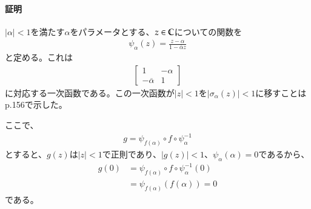 \paragraph{証明}





$|\alpha|<1$を満たす$\alpha$をパラメータとする、$z\in\mathbb{C}$についての関数を
\begin{align*}
    \psi_\alpha(z)=\frac{z-\alpha}{1-\overline{\alpha}z}
\end{align*}
と定める。これは
\begin{align*}
    \begin{bmatrix}
        1&-\alpha\\
        -\overline{\alpha}&1
    \end{bmatrix}
\end{align*}
に対応する一次函数である。この一次函数が$|z|<1$を$|\sigma_\alpha(z)|<1$に移すことはp.156で示した。

ここで、
\begin{align*}
    g=\psi_{f(\alpha)}\circ f\circ\psi_\alpha^{-1}
\end{align*}
とすると、$g(z)$は$|z|<1$で正則であり、$|g(z)|<1$、$\psi_\alpha(\alpha)=0$であるから、
\begin{align*}
    g(0)&=\psi_{f(\alpha)}\circ f\circ\psi_\alpha^{-1}(0)\\
    &=\psi_{f(\alpha)}(f(\alpha))=0
\end{align*}
である。

